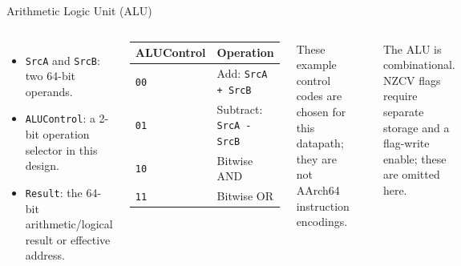 \documentclass[aspectratio=169,11pt,t]{beamer}
\newcommand{\code}[1]{\texttt{#1}}
\begin{document}
\begin{frame}{Arithmetic Logic Unit (ALU)}
\small
\begin{columns}[T,onlytextwidth]
\begin{itemize}\setlength{\itemsep}{5pt}
\item \code{SrcA} and \code{SrcB}: two 64-bit operands.
\item \code{ALUControl}: a 2-bit operation selector in this design.
\item \code{Result}: the 64-bit arithmetic/logical result or effective address.
\end{itemize}
\begin{center}
\renewcommand{\arraystretch}{1.15}
\begin{tabular}{ll}
\toprule
\rowcolor{white}
\textbf{ALUControl} & \textbf{Operation} \\
\midrule
\code{00} & Add: \code{SrcA + SrcB} \\
\code{01} & Subtract: \code{SrcA - SrcB} \\
\code{10} & Bitwise AND \\
\code{11} & Bitwise OR \\
\bottomrule
\end{tabular}
\end{center}
\scriptsize
These example control codes are chosen for this datapath; they are not AArch64 instruction encodings.
\begin{center}
\end{center}
\vspace{.15cm}
\scriptsize
The ALU is combinational. NZCV flags require separate storage and a flag-write enable; these are omitted here.
\end{columns}
\end{frame}
\end{document}
